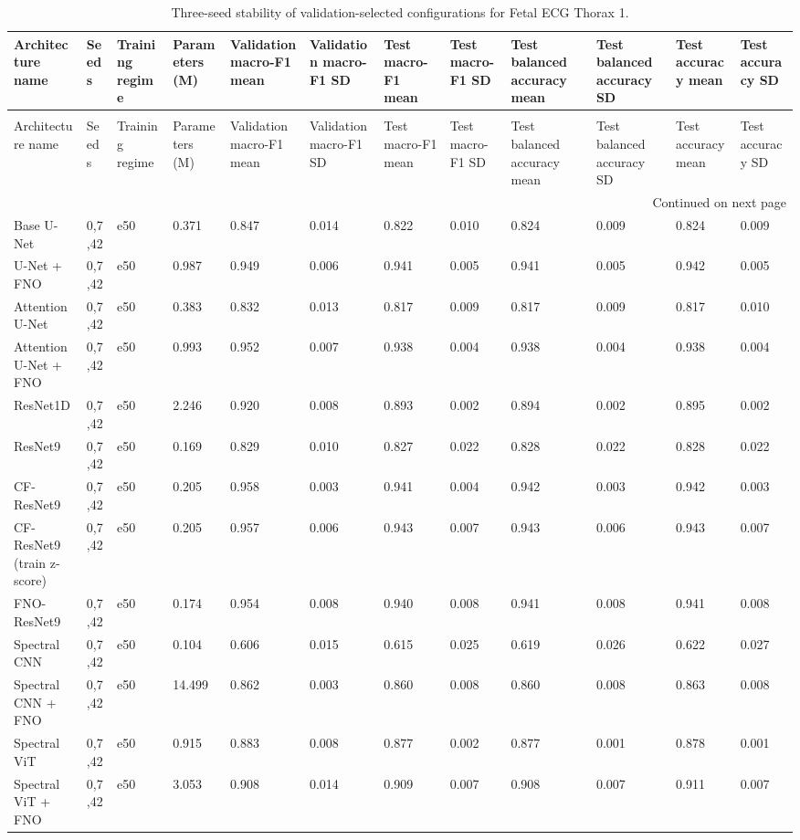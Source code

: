 \begin{longtable}{llllllllllll}
\caption{Three-seed stability of validation-selected configurations for Fetal ECG Thorax 1.} \label{tab:noninvasivefetalecgthorax1_seed_stability} \\
\toprule
Architecture name & Seeds & Training regime & Parameters (M) & Validation macro-F1 mean & Validation macro-F1 SD & Test macro-F1 mean & Test macro-F1 SD & Test balanced accuracy mean & Test balanced accuracy SD & Test accuracy mean & Test accuracy SD \\
\midrule
\endfirsthead
\caption[]{Three-seed stability of validation-selected configurations for Fetal ECG Thorax 1.} \\
\toprule
Architecture name & Seeds & Training regime & Parameters (M) & Validation macro-F1 mean & Validation macro-F1 SD & Test macro-F1 mean & Test macro-F1 SD & Test balanced accuracy mean & Test balanced accuracy SD & Test accuracy mean & Test accuracy SD \\
\midrule
\endhead
\midrule
\multicolumn{12}{r}{Continued on next page} \\
\midrule
\endfoot
\bottomrule
\endlastfoot
Base U-Net & 0,7,42 & e50 & 0.371 & 0.847 & 0.014 & 0.822 & 0.010 & 0.824 & 0.009 & 0.824 & 0.009 \\
U-Net + FNO & 0,7,42 & e50 & 0.987 & 0.949 & 0.006 & 0.941 & 0.005 & 0.941 & 0.005 & 0.942 & 0.005 \\
Attention U-Net & 0,7,42 & e50 & 0.383 & 0.832 & 0.013 & 0.817 & 0.009 & 0.817 & 0.009 & 0.817 & 0.010 \\
Attention U-Net + FNO & 0,7,42 & e50 & 0.993 & 0.952 & 0.007 & 0.938 & 0.004 & 0.938 & 0.004 & 0.938 & 0.004 \\
ResNet1D & 0,7,42 & e50 & 2.246 & 0.920 & 0.008 & 0.893 & 0.002 & 0.894 & 0.002 & 0.895 & 0.002 \\
ResNet9 & 0,7,42 & e50 & 0.169 & 0.829 & 0.010 & 0.827 & 0.022 & 0.828 & 0.022 & 0.828 & 0.022 \\
CF-ResNet9 & 0,7,42 & e50 & 0.205 & 0.958 & 0.003 & 0.941 & 0.004 & 0.942 & 0.003 & 0.942 & 0.003 \\
CF-ResNet9 (train z-score) & 0,7,42 & e50 & 0.205 & 0.957 & 0.006 & 0.943 & 0.007 & 0.943 & 0.006 & 0.943 & 0.007 \\
FNO-ResNet9 & 0,7,42 & e50 & 0.174 & 0.954 & 0.008 & 0.940 & 0.008 & 0.941 & 0.008 & 0.941 & 0.008 \\
Spectral CNN & 0,7,42 & e50 & 0.104 & 0.606 & 0.015 & 0.615 & 0.025 & 0.619 & 0.026 & 0.622 & 0.027 \\
Spectral CNN + FNO & 0,7,42 & e50 & 14.499 & 0.862 & 0.003 & 0.860 & 0.008 & 0.860 & 0.008 & 0.863 & 0.008 \\
Spectral ViT & 0,7,42 & e50 & 0.915 & 0.883 & 0.008 & 0.877 & 0.002 & 0.877 & 0.001 & 0.878 & 0.001 \\
Spectral ViT + FNO & 0,7,42 & e50 & 3.053 & 0.908 & 0.014 & 0.909 & 0.007 & 0.908 & 0.007 & 0.911 & 0.007 \\
\end{longtable}
